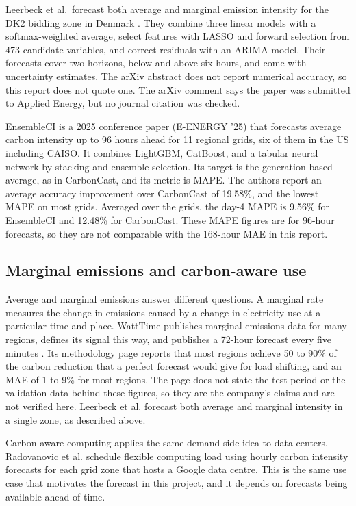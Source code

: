 \documentclass[10pt,journal,compsoc]{IEEEtran}
\begin{document}
Leerbeck et al.\ forecast both average and marginal emission intensity for the DK2 bidding zone in Denmark \cite{leerbeck2020}. They combine three linear models with a softmax-weighted average, select features with LASSO and forward selection from 473 candidate variables, and correct residuals with an ARIMA model. Their forecasts cover two horizons, below and above six hours, and come with uncertainty estimates. The arXiv abstract does not report numerical accuracy, so this report does not quote one. The arXiv comment says the paper was submitted to Applied Energy, but no journal citation was checked.

EnsembleCI \cite{ensembleci2025} is a 2025 conference paper (E-ENERGY '25) that forecasts average carbon intensity up to 96 hours ahead for 11 regional grids, six of them in the US including CAISO. It combines LightGBM, CatBoost, and a tabular neural network by stacking and ensemble selection. Its target is the generation-based average, as in CarbonCast, and its metric is MAPE. The authors report an average accuracy improvement over CarbonCast of 19.58\%, and the lowest MAPE on most grids. Averaged over the grids, the day-4 MAPE is 9.56\% for EnsembleCI and 12.48\% for CarbonCast. These MAPE figures are for 96-hour forecasts, so they are not comparable with the 168-hour MAE in this report.

\subsection{Marginal emissions and carbon-aware use}
Average and marginal emissions answer different questions. A marginal rate measures the change in emissions caused by a change in electricity use at a particular time and place. WattTime publishes marginal emissions data for many regions, defines its signal this way, and publishes a 72-hour forecast every five minutes \cite{watttime}. Its methodology page reports that most regions achieve 50 to 90\% of the carbon reduction that a perfect forecast would give for load shifting, and an MAE of 1 to 9\% for most regions. The page does not state the test period or the validation data behind these figures, so they are the company's claims and are not verified here. Leerbeck et al. \cite{leerbeck2020} forecast both average and marginal intensity in a single zone, as described above.

Carbon-aware computing applies the same demand-side idea to data centers. Radovanovic et al. \cite{radovanovic2021} schedule flexible computing load using hourly carbon intensity forecasts for each grid zone that hosts a Google data centre. This is the same use case that motivates the forecast in this project, and it depends on forecasts being available ahead of time.
\end{document}
